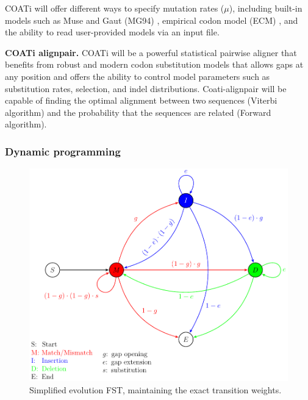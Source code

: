 COATi will offer different ways to specify mutation rates ($\mu$), including
built-in models such as Muse and Gaut (MG94) \parencite{muse_gaut_1994},
empirical codon model (ECM) \parencite{kosiol_ECM_2007}, and the ability to read
user-provided models via an input file.

\textbf{COATi alignpair.}
COATi will be a powerful statistical pairwise aligner that benefits from
robust and modern codon substitution models that allows gaps at any position and
offers the ability to control model parameters such as substitution rates,
selection, and indel distributions.
Coati-alignpair will be capable of finding the optimal alignment between two
sequences (Viterbi
algorithm) and the probability that the sequences are related (Forward algorithm).

\vspace{1em}

\subsubsection{Dynamic programming}

\begin{figure}
    \vspace{-3em}
    \centering
    \includegraphics[scale=0.6]{figures/fig-dp-model.pdf}
    \caption{Simplified evolution FST, maintaining the exact transition weights.}
    \label{fig:dp-model}
\end{figure}

